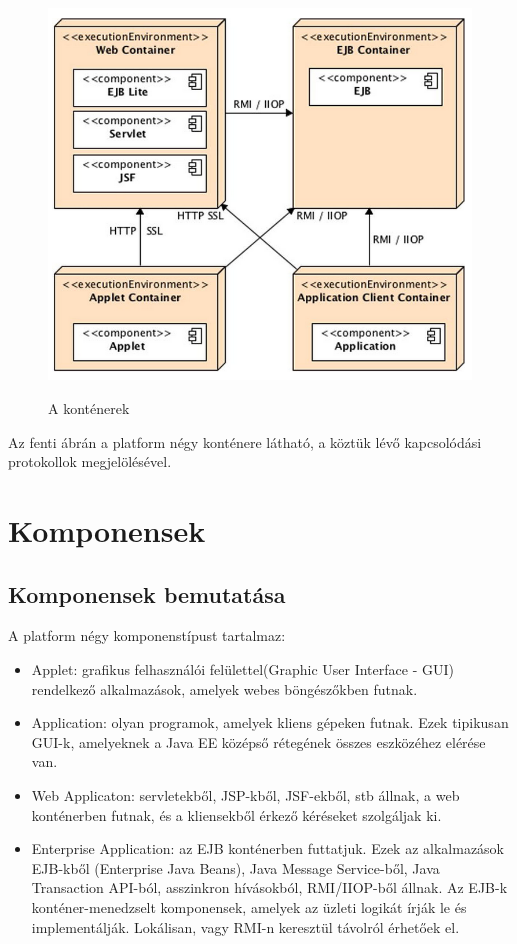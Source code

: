 \documentclass[centeredchapter]{thesis-ekf}
\theoremstyle{definition}
\theoremstyle{remark}
\begin{document}
\hypertarget{figure-kontenerek}{}
\begin{figure}[!h]
	\centering
	\includegraphics[width=14cm]{kontenerek.png}
	\caption{A konténerek}\cite{BJEE}
\end{figure}

Az fenti ábrán a platform négy konténere látható, a köztük lévő kapcsolódási protokollok megjelölésével.\cite{BJEE}

\newpage

\section{Komponensek}

\subsection{Komponensek bemutatása}
A platform négy komponenstípust tartalmaz:
\begin{itemize}
	\item Applet: grafikus felhasználói felülettel(Graphic User Interface - GUI) rendelkező alkalmazások, amelyek webes böngészőkben futnak.
	
	\item Application: olyan programok, amelyek kliens gépeken futnak. Ezek tipikusan GUI-k, amelyeknek a Java EE középső rétegének összes eszközéhez elérése van.
	
	\item Web Applicaton: servletekből, JSP-kből, JSF-ekből, stb állnak, a web konténerben futnak, és a kliensekből érkező kéréseket szolgáljak ki.
	
	\item Enterprise Application: az EJB konténerben futtatjuk. Ezek az alkalmazások EJB-kből (Enterprise Java Beans), Java Message Service-ből, Java Transaction API-ból, asszinkron hívásokból, RMI/IIOP-ből állnak. Az EJB-k konténer-menedzselt komponensek, amelyek az üzleti logikát írják le és implementálják. Lokálisan, vagy RMI-n keresztül távolról érhetőek el. 
	
\end{itemize} 
\end{document}
